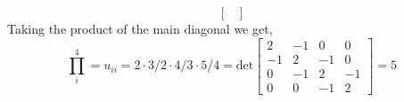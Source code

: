 \begin{enumerate}[label=\arabic*.]
\begin{mdframed}[style=MyFrame]
\begin{equation}
\begin{bmatrix}
                \end{bmatrix}
            \end{equation}
            Taking the product of the main diagonal we get,
            \begin{equation}
                \prod_{i}^{4} = u_{ii}
                =
                2 \cdot 3/2 \cdot 4/3 \cdot 5/4
                =
                \text{det}
                \begin{bmatrix}
                    2   &   -1  &   0   &   0   \\
                    -1  &   2   &   -1  &   0   \\
                    0   &   -1  &   2   &   -1  \\
                    0   &   0   &   -1  &   2
                \end{bmatrix}
                =
                5
            \end{equation}
        \end{mdframed}


\end{enumerate}
